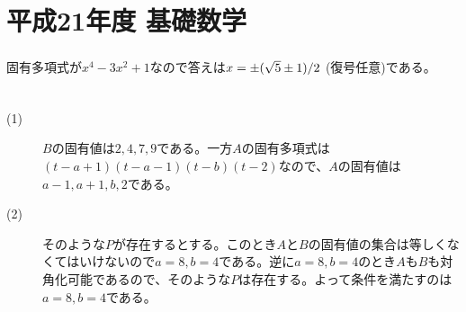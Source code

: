 \section{平成21年度 基礎数学}

\subsubsection{}%
\begin{sol}
  固有多項式が$x^4 - 3x^2 + 1$なので答えは$x = \pm (\sqrt{5} \pm 1)/2 $ (復号任意)である。
\end{sol}

\newpage


\subsubsection{}%
\begin{sol} ${}$
  \begin{description}
    \item[(1)] $B$の固有値は$2,4,7,9$である。一方$A$の固有多項式は$(t-a+1)(t-a-1)(t-b)(t-2)$なので、$A$の固有値は$a-1,a+1,b,2$である。
    \item[(2)] そのような$P$が存在するとする。このとき$A$と$B$の固有値の集合は等しくなくてはいけないので$a=8, b=4$である。逆に$a=8, b=4$のとき$A$も$B$も対角化可能であるので、そのような$P$は存在する。よって条件を満たすのは$a=8, b=4$である。
  \end{description}
\end{sol}

